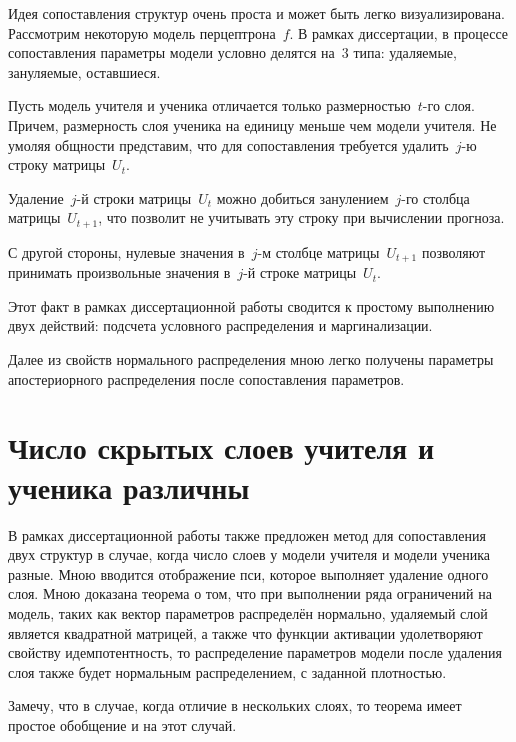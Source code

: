 \documentclass[10pt, twoside]{article}
\begin{document}
Идея сопоставления структур очень проста и может быть легко визуализирована. Рассмотрим некоторую модель перцептрона~$f$. В рамках диссертации, в процессе сопоставления параметры модели условно делятся на~$3$ типа: удаляемые, зануляемые, оставшиеся.

Пусть модель учителя и ученика отличается только размерностью~$t$-го слоя. Причем, размерность слоя ученика на единицу меньше чем модели учителя. Не умоляя общности представим, что для сопоставления требуется удалить~$j$-ю строку матрицы~$U_t$.

Удаление~$j$-й строки матрицы~$U_t$ можно добиться занулением~$j$-го столбца матрицы~$U_{t+1}$, что позволит не учитывать эту строку при вычислении прогноза.

С другой стороны, нулевые значения в~$j$-м столбце матрицы~$U_{t+1}$ позволяют принимать произвольные значения в~$j$-й строке матрицы~$U_{t}$.

Этот факт в рамках диссертационной работы сводится к простому выполнению двух действий: подсчета условного распределения и маргинализации.

Далее из свойств нормального распределения мною легко получены параметры апостериорного распределения после сопоставления параметров.

\section{Число скрытых слоев учителя и ученика различны}
В рамках диссертационной работы также предложен метод для сопоставления двух структур в случае, когда число слоев у модели учителя и модели ученика разные.
Мною вводится отображение пси, которое выполняет удаление одного слоя.
Мною доказана теорема о том, что при выполнении ряда ограничений на модель, таких как вектор параметров распределён нормально, удаляемый слой является квадратной матрицей, а также что функции активации удолетворяют свойству идемпотентность, то распределение параметров модели после удаления слоя также будет нормальным распределением, с заданной плотностью.

Замечу, что в случае, когда отличие в нескольких слоях, то теорема имеет простое обобщение и на этот случай.
\end{document}
